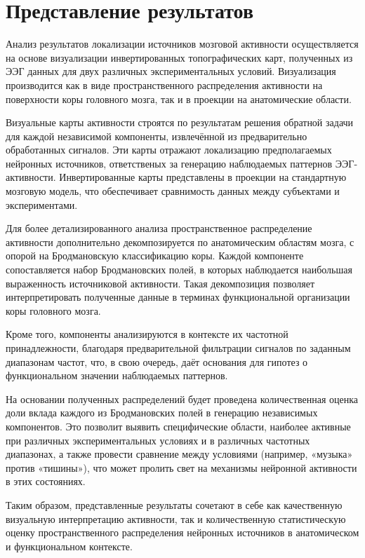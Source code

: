 \chapter{Представление результатов}
Анализ результатов локализации источников мозговой активности осуществляется на основе визуализации инвертированных топографических карт, полученных из ЭЭГ данных для двух различных экспериментальных условий. Визуализация производится как в виде пространственного распределения активности на поверхности коры головного мозга, так и в проекции на анатомические области.

Визуальные карты активности строятся по результатам решения обратной задачи для каждой независимой компоненты, извлечённой из предварительно обработанных сигналов. Эти карты отражают локализацию предполагаемых нейронных источников, ответственых за генерацию наблюдаемых паттернов ЭЭГ-активности. Инвертированные карты представлены в проекции на стандартную мозговую модель, что обеспечивает сравнимость данных между субъектами и экспериментами.

Для более детализированного анализа пространственное распределение активности дополнительно декомпозируется по анатомическим областям мозга, с опорой на Бродмановскую классификацию коры. Каждой компоненте сопоставляется набор Бродмановских полей, в которых наблюдается наибольшая выраженность источниковой активности. Такая декомпозиция позволяет интерпретировать полученные данные в терминах функциональной организации коры головного мозга.

Кроме того, компоненты анализируются в контексте их частотной принадлежности, благодаря предварительной фильтрации сигналов по заданным диапазонам частот, что, в свою очередь, даёт основания для гипотез о функциональном значении наблюдаемых паттернов.

На основании полученных распределений будет проведена количественная оценка доли вклада каждого из Бродмановских полей в генерацию независимых компонентов. Это позволит выявить специфические области, наиболее активные при различных экспериментальных условиях и в различных частотных диапазонах, а также провести сравнение между условиями (например, «музыка» против «тишины»), что может пролить свет на механизмы нейронной активности в этих состояниях.

Таким образом, представленные результаты сочетают в себе как качественную визуальную интерпретацию активности, так и количественную статистическую оценку пространственного распределения нейронных источников в анатомическом и функциональном контексте.

\endinput